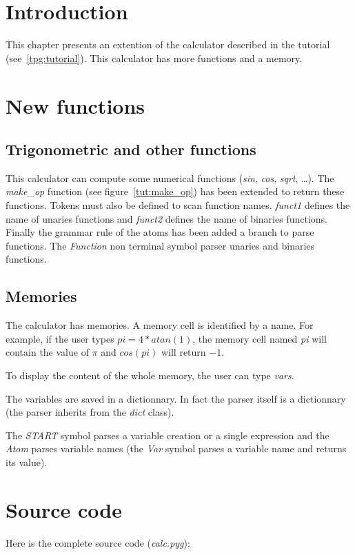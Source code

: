 \section{Introduction}

This chapter presents an extention of the calculator described in the tutorial (see~\ref{tpg:tutorial}).
This calculator has more functions and a memory.

\section{New functions}

\subsection{Trigonometric and other functions}

This calculator can compute some numerical functions (\emph{sin}, \emph{cos}, \emph{sqrt}, \ldots).
The \emph{make\_op} function (see figure~\ref{tut:make_op}) has been extended to return these functions.
Tokens must also be defined to scan function names.
\emph{funct1} defines the name of unaries functions and \emph{funct2} defines the name of binaries functions.
Finally the grammar rule of the atoms has been added a branch to parse functions.
The \emph{Function} non terminal symbol parser unaries and binaries functions.

\subsection{Memories}

The calculator has memories.
A memory cell is identified by a name.
For example, if the user types \emph{$pi = 4*atan(1)$}, the memory cell named \emph{pi} will contain the value of \emph{$\pi$} and \emph{$cos(pi)$} will return \emph{$-1$}.

To display the content of the whole memory, the user can type \emph{vars}.

The variables are saved in a dictionnary.
In fact the parser itself is a dictionnary (the parser inherits from the \emph{dict} class).

The \emph{START} symbol parses a variable creation or a single expression and the \emph{Atom} parses variable names (the \emph{Var} symbol parses a variable name and returns its value).

\section{Source code}

Here is the complete source code (\emph{calc.pyg}):

